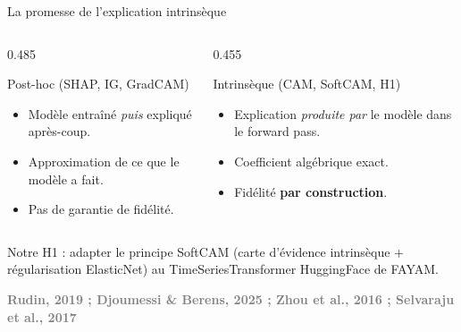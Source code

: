 \documentclass[10pt]{beamer}
\newcommand{\source}[1]{\vspace{4pt}\hfill{\textcolor{gray}{\textbf{\tiny #1}}}}
\begin{document}
\begin{frame}{La promesse de l'explication intrinsèque}
  \begin{columns}
    \begin{column}{0.485\textwidth}
      \begin{block}{Post-hoc (SHAP, IG, GradCAM)}
        \begin{itemize}
          \item Modèle entraîné \emph{puis} expliqué après-coup.
          \item Approximation de ce que le modèle a fait.
          \item Pas de garantie de fidélité.
        \end{itemize}
      \end{block}
    \end{column}
    \begin{column}{0.455\textwidth}
      \begin{exampleblock}{Intrinsèque (CAM, SoftCAM, H1)}
        \begin{itemize}
          \item Explication \emph{produite par} le modèle dans le forward pass.
          \item Coefficient algébrique exact.
          \item Fidélité \textbf{par construction}.
        \end{itemize}
      \end{exampleblock}
    \end{column}
  \end{columns}

  \vspace{6pt}
  \begin{verdictbox}
    Notre H1 : adapter le principe SoftCAM (carte d'évidence intrinsèque + régularisation ElasticNet) au TimeSeriesTransformer HuggingFace de FAYAM.
  \end{verdictbox}

  \source{Rudin, 2019 ; Djoumessi \& Berens, 2025 ; Zhou et al., 2016 ; Selvaraju et al., 2017}
\end{frame}
\end{document}
